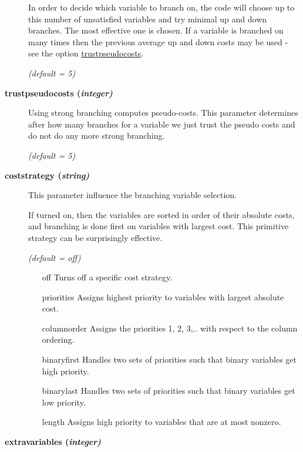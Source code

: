 \begin{description}
In order to decide which variable to branch on, the code will choose up to this number of unsatisfied variables and try minimal up and down branches.
The most effective one is chosen.
If a variable is branched on many times then the previous average up and down costs may be used - see the option \hyperlink{trustpseudocosts}{trustpseudocosts}.

\textsl{(default = 5)}

\item[\label{trustpseudocosts}\hypertarget{trustpseudocosts}
{\textbf{trustpseudocosts (\slshape{integer})}}]\hspace{1.0in}

Using strong branching computes pseudo-costs.
This parameter determines after how many branches for a variable we just trust the pseudo costs and do not do any more strong branching.

\textsl{(default = 5)}

\item[\label{coststrategy}\hypertarget{coststrategy}
{\textbf{coststrategy (\slshape{string})}}]\hspace{1.0in}

This parameter influence the branching variable selection.

If turned on, then the variables are sorted in order of their absolute costs, and branching is done first on variables with largest cost.
This primitive strategy can be surprisingly effective.

\textsl{(default = off)}
\begin{itemize}
\item[off] 
Turns off a specific cost strategy.
\item[priorities] 
Assigns highest priority to variables with largest absolute cost.
\item[columnorder] 
Assigns the priorities 1, 2, 3,.. with respect to the column ordering.
\item[binaryfirst] 
Handles two sets of priorities such that binary variables get high priority.
\item[binarylast] 
Handles two sets of priorities such that binary variables get low priority.
\item[length] 
Assigns high priority to variables that are at most nonzero.
\end{itemize}

\item[\label{extravariables}\hypertarget{extravariables}
{\textbf{extravariables (\slshape{integer})}}]\hspace{1.0in}


\end{description}
